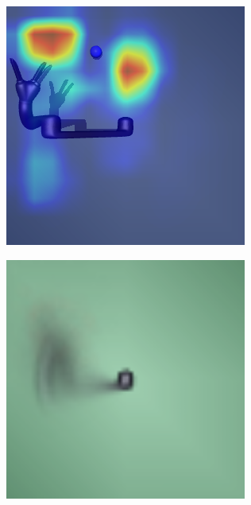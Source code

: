 \begin{figure}
  \centering
  \begin{subfigure}{0.32\columnwidth}
    \includegraphics[width=\linewidth]{figures/chapter6/occ_jaco_baseline}
  \end{subfigure}
  \begin{subfigure}{0.32\columnwidth}
    \includegraphics[width=\linewidth]{figures/chapter6/average_map_jaco_large.png}
  \end{subfigure}


\end{figure}
